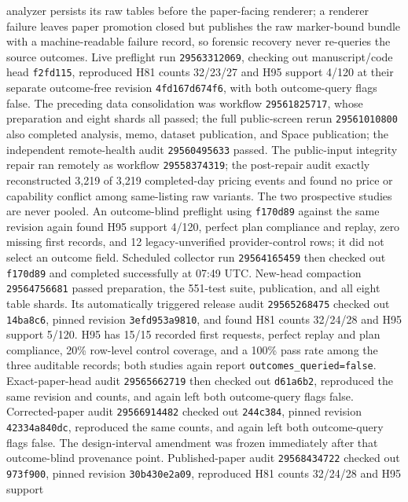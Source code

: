 \documentclass[11pt]{article}
\newcommand{\1}{\mathbf{1}}
\begin{document}
analyzer persists its raw tables before the paper-facing renderer; a renderer
failure leaves paper promotion closed but publishes the raw marker-bound bundle
with a machine-readable failure record, so forensic recovery never re-queries
the source outcomes.  Live preflight
run \texttt{29563312069}, checking out manuscript/code head \texttt{f2fd115},
reproduced H81 counts 32/23/27 and H95 support 4/120 at their separate
outcome-free revision \texttt{4fd167d674f6}, with both
outcome-query flags false.  The preceding data consolidation was workflow
\texttt{29561825717}, whose preparation and eight shards all passed; the
full public-screen rerun \texttt{29561010800} also completed analysis, memo,
dataset publication, and Space publication; the independent remote-health audit
\texttt{29560495633} passed.  The public-input integrity repair ran remotely as
workflow \texttt{29558374319}; the post-repair audit exactly reconstructed 3,219
of 3,219 completed-day pricing events and found no price or capability conflict
among same-listing raw variants.  The two prospective studies are never pooled.
An outcome-blind preflight using \texttt{f170d89} against the same revision again
found H95 support 4/120, perfect plan compliance and replay, zero missing first
records, and 12 legacy-unverified provider-control rows; it did not select an
outcome field.  Scheduled collector run \texttt{29564165459} then checked out
\texttt{f170d89} and completed successfully at 07:49 UTC.  New-head compaction
\texttt{29564756681} passed preparation, the 551-test suite, publication, and all
eight table shards.  Its automatically triggered release audit
\texttt{29565268475} checked out \texttt{14ba8c6}, pinned revision
\texttt{3efd953a9810}, and found H81 counts 32/24/28 and H95 support 5/120.  H95
has 15/15 recorded first requests, perfect replay and plan compliance, 20\%
row-level control coverage, and a 100\% pass rate among the three auditable
records; both studies again report \texttt{outcomes\_queried=false}.
Exact-paper-head audit \texttt{29565662719} then checked out
\texttt{d61a6b2}, reproduced the same revision and counts, and again left both
outcome-query flags false.
Corrected-paper audit \texttt{29566914482} checked out \texttt{244c384}, pinned
revision \texttt{42334a840dc}, reproduced the same counts, and again left both
outcome-query flags false.  The design-interval amendment was frozen immediately
after that outcome-blind provenance point.
Published-paper audit \texttt{29568434722} checked out \texttt{973f900}, pinned
revision \texttt{30b430e2a09}, reproduced H81 counts 32/24/28 and H95 support
\end{document}
